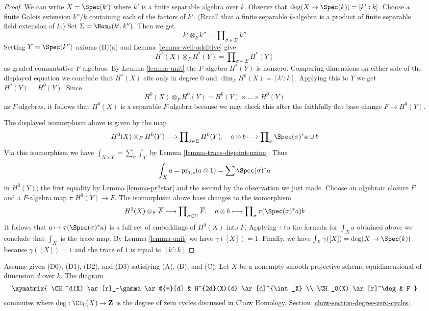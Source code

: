 \begin{proof}
We can write $X = \Spec(k')$ where $k'$ is a finite separable
algebra over $k$. Observe that $\deg(X \to \Spec(k)) = [k' : k]$.
Choose a finite Galois extension $k''/k$ containing each of the
factors of $k'$. (Recall that a finite separable $k$-algebra is
a product of finite separable field extension of $k$.)
Set $\Sigma = \Hom_k(k', k'')$. Then we get
$$
k' \otimes_k k'' = \prod\nolimits_{\sigma \in \Sigma} k''
$$
Setting $Y = \Spec(k'')$ axioms (B)(a) and Lemma \ref{lemma-weil-additive} give
$$
H^*(X) \otimes_F H^*(Y) =
\prod\nolimits_{\sigma \in \Sigma} H^*(Y)
$$
as graded commutative $F$-algebras. By Lemma \ref{lemma-unit} the
$F$-algebra $H^*(Y)$ is nonzero. Comparing dimensions on either side
of the displayed equation we conclude that $H^*(X)$ sits only in degree $0$
and $\dim_F H^0(X) = [k' : k]$. Applying this to $Y$ we get
$H^*(Y) = H^0(Y)$. Since
$$
H^0(X) \otimes_F H^0(Y) = H^0(Y) \times \ldots \times H^0(Y)
$$
as $F$-algebras, it follows that $H^0(X)$ is a separable $F$-algebra
because we may check this after the faithfully flat base change
$F \to H^0(Y)$.

\medskip\noindent
The displayed isomorphism above is given by the map
$$
H^0(X) \otimes_F H^0(Y) \longrightarrow
\prod\nolimits_{\sigma \in \Sigma} H^0(Y),\quad
a \otimes b \longmapsto \prod\nolimits_\sigma \Spec(\sigma)^*a \cup b
$$
Via this isomorphism we have $\int_{X \times Y} = \sum_\sigma \int_Y$ by
Lemma \ref{lemma-trace-disjoint-union}. Thus
$$
\int_X a = \text{pr}_{1, *}(a \otimes 1) = \sum \Spec(\sigma)^*a
$$
in $H^0(Y)$; the first equality by Lemma \ref{lemma-pr2star}
and the second by the observation we just made. Choose an
algebraic closure $\overline{F}$ and
a $F$-algebra map $\tau : H^0(Y) \to \overline{F}$.
The isomorphism above base changes to the isomorphism
$$
H^0(X) \otimes_F \overline{F} \longrightarrow
\prod\nolimits_{\sigma \in \Sigma} \overline{F},\quad
a \otimes b \longmapsto \prod\nolimits_\sigma \tau(\Spec(\sigma)^*a) b
$$
It follows that $a \mapsto \tau(\Spec(\sigma)^*a)$ is a full set
of embeddings of $H^0(X)$ into $\overline{F}$. Applying $\tau$
to the formula for $\int_X a$ obtained above we conclude
that $\int_X$ is the trace map.
By Lemma \ref{lemma-unit} we have $\gamma([X]) = 1$.
Finally, we have $\int_X \gamma([X]) = \deg(X \to \Spec(k))$
because $\gamma([X]) = 1$ and the trace of $1$ is equal to $[k' : k]$
\end{proof}

\begin{lemma}
\label{lemma-degrees-cycles}
Assume given (D0), (D1), (D2), and (D3) satisfying (A), (B), and (C).
Let $X$ be a nonempty smooth projective scheme
equidimensional of dimension $d$ over $k$. The diagram
$$
\xymatrix{
\CH^d(X) \ar[r]_-\gamma \ar@{=}[d] &
H^{2d}(X)(d) \ar[d]^{\int_X} \\
\CH_0(X) \ar[r]^\deg & F
}
$$
commutes where $\deg : \CH_0(X) \to \mathbf{Z}$ is the degree of
zero cycles discussed in Chow Homology, Section
\ref{chow-section-degree-zero-cycles}.
\end{lemma}

